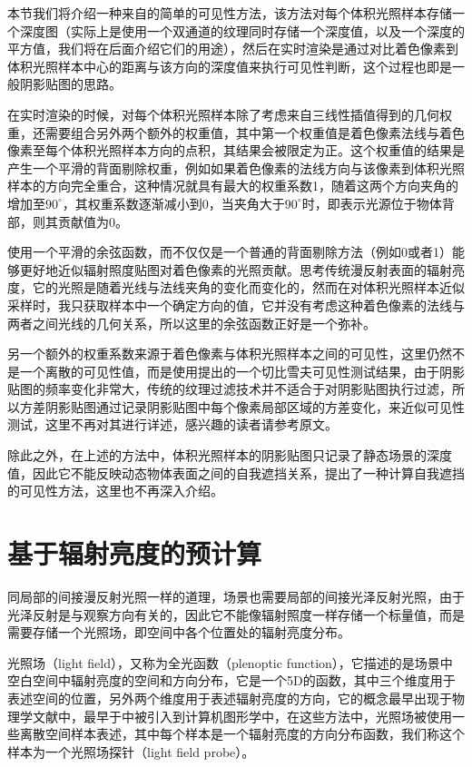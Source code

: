 本节我们将介绍一种来自\cite{a:Lightprobeinterpolationusingtetrahedraltessellations}的简单的可见性方法，该方法对每个体积光照样本存储一个深度图（实际上是使用一个双通道的纹理同时存储一个深度值，以及一个深度的平方值，我们将在后面介绍它们的用途），然后在实时渲染是通过对比着色像素到体积光照样本中心的距离与该方向的深度值来执行可见性判断，这个过程也即是一般阴影贴图的思路。

在实时渲染的时候，对每个体积光照样本除了考虑来自三线性插值得到的几何权重，还需要组合另外两个额外的权重值，其中第一个权重值是着色像素法线与着色像素至每个体积光照样本方向的点积，其结果会被限定为正。这个权重值的结果是产生一个平滑的背面剔除权重，例如如果着色像素的法线方向与该像素到体积光照样本的方向完全重合，这种情况就具有最大的权重系数1，随着这两个方向夹角的增加至$90^{\circ}$，其权重系数逐渐减小到0，当夹角大于$90^{\circ}$时，即表示光源位于物体背部，则其贡献值为0。

\begin{myshaded}
	使用一个平滑的余弦函数，而不仅仅是一个普通的背面剔除方法（例如0或者1）能够更好地近似辐射照度贴图对着色像素的光照贡献。思考传统漫反射表面的辐射亮度，它的光照是随着光线与法线夹角的变化而变化的，然而在对体积光照样本近似采样时，我只获取样本中一个确定方向的值，它并没有考虑这种着色像素的法线与两者之间光线的几何关系，所以这里的余弦函数正好是一个弥补。
\end{myshaded}

另一个额外的权重系数来源于着色像素与体积光照样本之间的可见性，这里仍然不是一个离散的可见性值，而是使用\cite{a:VarianceShadowMaps}提出的一个切比雪夫可见性测试结果，由于阴影贴图的频率变化非常大，传统的纹理过滤技术并不适合于对阴影贴图执行过滤，所以方差阴影贴图通过记录阴影贴图中每个像素局部区域的方差变化，来近似可见性测试，这里不再对其进行详述，感兴趣的读者请参考原文。

除此之外，在上述的方法中，体积光照样本的阴影贴图只记录了静态场景的深度值，因此它不能反映动态物体表面之间的自我遮挡关系，\cite{a:PrecomputedLightinginCallofDuty}提出了一种计算自我遮挡的可见性方法，这里也不再深入介绍。




\section{基于辐射亮度的预计算}
同局部的间接漫反射光照一样的道理，场景也需要局部的间接光泽反射光照，由于光泽反射是与观察方向有关的，因此它不能像辐射照度一样存储一个标量值，而是需要存储一个光照场，即空间中各个位置处的辐射亮度分布。

光照场（light field），又称为全光函数（plenoptic function），它描述的是场景中空白空间中辐射亮度的空间和方向分布，它是一个5D的函数，其中三个维度用于表述空间的位置，另外两个维度用于表述辐射亮度的方向，它的概念最早出现于物理学文献中，最早于\cite{a:LightFieldRendering,a:Thelumigraph}中被引入到计算机图形学中，在这些方法中，光照场被使用一些离散空间样本表述，其中每个样本是一个辐射亮度的方向分布函数，我们称这个样本为一个光照场探针（light field probe）。

